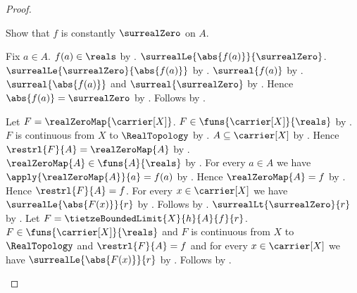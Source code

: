 \begin{proof}
    \begin{byCase}
        Show that $f$ is constantly $\surrealZero$ on $A$.
        \begin{subproof}
            Fix $a\in A$.
            $f(a)\in\reals$ by .
            $\surrealLe{\abs{f(a)}}{\surrealZero}$.
            $\surrealLe{\surrealZero}{\abs{f(a)}}$
                by
                .
            $\surreal{f(a)}$ by .
            $\surreal{\abs{f(a)}}$ and $\surreal{\surrealZero}$
                by .
            Hence $\abs{f(a)}=\surrealZero$
                by .
            Follows by
                .
        \end{subproof}
        Let $F=\realZeroMap{\carrier[X]}$.
        $F\in\funs{\carrier[X]}{\reals}$
            by .
        $F$ is continuous from $X$ to $\RealTopology$
            by .
        $A\subseteq\carrier[X]$ by .
        Hence $\restrl{F}{A}=\realZeroMap{A}$
            by .
        $\realZeroMap{A}\in\funs{A}{\reals}$
            by .
        For every $a\in A$ we have $\apply{\realZeroMap{A}}{a}=f(a)$
            by .
        Hence $\realZeroMap{A}=f$
            by .
        Hence $\restrl{F}{A}=f$.
        For every $x\in\carrier[X]$ we have
            $\surrealLe{\abs{F(x)}}{r}$
            by
            .
        Follows by \auto.
        $\surrealLt{\surrealZero}{r}$
            by
            .
        Let $F=\tietzeBoundedLimit{X}{h}{A}{f}{r}$.
        $F\in\funs{\carrier[X]}{\reals}$ and
            $F$ is continuous from $X$ to $\RealTopology$ and
            $\restrl{F}{A}=f$ and
            for every $x\in\carrier[X]$ we have
                $\surrealLe{\abs{F(x)}}{r}$
            by
            .
        Follows by \auto.
    \end{byCase}
\end{proof}

